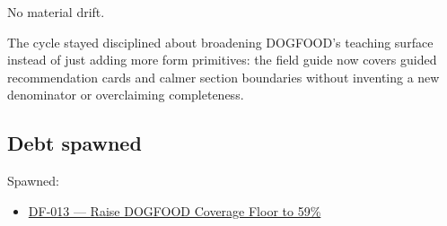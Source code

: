 No material drift.

The cycle stayed disciplined about broadening DOGFOOD's teaching surface instead of just adding more form primitives: the field guide now covers guided recommendation cards and calmer section boundaries without inventing a new denominator or overclaiming completeness.

\subsection{Debt spawned}\label{record-074-debt-spawned}

Spawned:

\begin{itemize}
\tightlist
\item
  \href{https://github.com/flyingrobots/bijou/blob/cbd70612140e7a450d764b3c7be1c6af878b99bc/docs/design/DF-013-raise-dogfood-coverage-floor-to-59-percent.md}{DF-013 --- Raise DOGFOOD Coverage Floor to 59\%}
\end{itemize}

